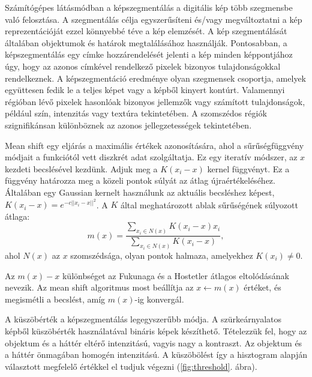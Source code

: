 

Számítógépes látásmódban a képszegmentálás a digitális kép több szegmensbe való felosztása. A szegmentálás célja egyszerűsíteni és/vagy megváltoztatni a kép reprezentációját ezzel könnyebbé téve a kép elemzését. A kép szegmentálását általában objektumok és határok megtalálásához használják. Pontosabban, a képszegmentálás egy címke hozzárendelését jelenti a kép minden képpontjához úgy, hogy az azonos címkével rendelkező pixelek bizonyos tulajdonságokkal rendelkeznek. A képszegmentáció eredménye olyan szegmensek csoportja, amelyek együttesen fedik le a teljes képet vagy a képből kinyert kontúrt. Valamennyi régióban lévő pixelek hasonlóak bizonyos jellemzők vagy számított tulajdonságok, például szín, intenzitás vagy textúra tekintetében. A szomszédos régiók szignifikánsan különböznek az azonos jellegzetességek tekintetében.



Mean shift egy eljárás a maximális értékek azonosítására, ahol a sűrűségfüggvény módjait a funkciótól vett diszkrét adat szolgáltatja. Ez egy iteratív módszer, az $x$ kezdeti becslésével kezdünk. Adjuk meg a $K(x_i - x)$ kernel függvényt. Ez a függvény határozza meg a közeli pontok súlyát az átlag újraértékeléséhez. Általában egy Gaussian kernelt használunk az aktuális becsléshez képest, $K (x_i - x) = e ^ {- c || x_i - x || ^ 2}$. A $K$ által meghatározott ablak sűrűségének súlyozott átlaga: 
$$
m(x) =
\frac{\sum_{x_i \in N(x)}K(x_i-x)x_i}{\sum_{x_i \in N(x)}K(x_i-x)},
$$
ahol $N(x)$ az $x$ szomszédsága, olyan pontok halmaza, amelyekhez $K(x_ {i}) \neq 0$.

Az $m (x) -x$ különbséget az Fukunaga és a Hostetler átlagos eltolódásának nevezik. Az mean shift algoritmus most beállítja az $x \leftarrow m(x)$ értéket, és megismétli a becslést, amíg $m(x)$-ig konvergál.



A küszöbérték a képszegmentálás legegyszerűbb módja. A szürkeárnyalatos képből küszöbérték használatával bináris képek készíthető. Tételezzük fel, hogy az objektum és a háttér eltérő intenzitású, vagyis nagy a kontraszt. Az objektum és a háttér önmagában homogén intenzitású. A küszöbölést így a hisztogram alapján választott megfelelő értékkel el tudjuk végezni (\ref{fig:threshold}. ábra).

